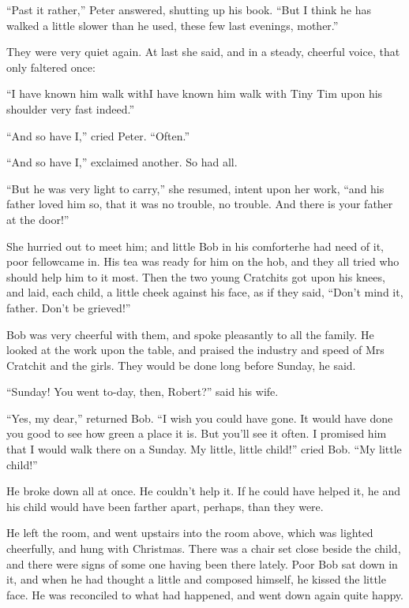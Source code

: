 \documentclass[paper=5.5in:8.5in,BCOR=5mm,twoside,DIV=calc,12pt,usegeometry]{scrbook} %
\begin{document}
\enquote{Past it rather,} Peter answered, shutting up his book. \enquote{But I think he has walked a little slower than he used, these few last evenings, mother.}

They were very quiet again. At last she said, and in a steady, cheerful voice, that only faltered once:

\enquote{I have known him walk with\textemdash I have known him walk with Tiny Tim upon his shoulder very fast indeed.}

\enquote{And so have I,} cried Peter. \enquote{Often.}

\enquote{And so have I,} exclaimed another. So had all.

\enquote{But he was very light to carry,} she resumed, intent upon her work, \enquote{and his father loved him so, that it was no trouble, no trouble. And there is your father at the door!}

She hurried out to meet him; and little Bob in his comforter\textemdash he had need of it, poor fellow\textemdash came in. His tea was ready for him on the hob, and they all tried who should help him to it most. Then the two young Cratchits got upon his knees, and laid, each child, a little cheek against his face, as if they said, \enquote{Don't mind it, father. Don't be grieved!}

Bob was very cheerful with them, and spoke pleasantly to all the family. He looked at the work upon the table, and praised the industry and speed of Mrs Cratchit and the girls. They would be done long before Sunday, he said.

\enquote{Sunday! You went to-day, then, Robert?} said his wife.

\enquote{Yes, my dear,} returned Bob. \enquote{I wish you could have gone. It would have done you good to see how green a place it is. But you'll see it often. I promised him that I would walk there on a Sunday. My little, little child!} cried Bob. \enquote{My little child!}

He broke down all at once. He couldn't help it. If he could have helped it, he and his child would have been farther apart, perhaps, than they were.

He left the room, and went upstairs into the room above, which was lighted cheerfully, and hung with Christmas. There was a chair set close beside the child, and there were signs of some one having been there lately. Poor Bob sat down in it, and when he had thought a little and composed himself, he kissed the little face. He was reconciled to what had happened, and went down again quite happy.
\end{document}
